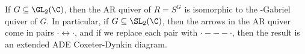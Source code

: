 \begin{cor}
If $G \subseteq \GL_2(\C)$, then the AR quiver of $R= S^G$ is isomorphic to the \mc-Gabriel quiver of $G$. In particular, if $G \subseteq \SL_2(\C)$, then the arrows in the AR quiver come in pairs $\cdot \leftrightarrow \cdot$, and if we replace each pair with $\cdot --- \cdot$, then the result is an extended ADE Coxeter-Dynkin diagram.
\end{cor}











































